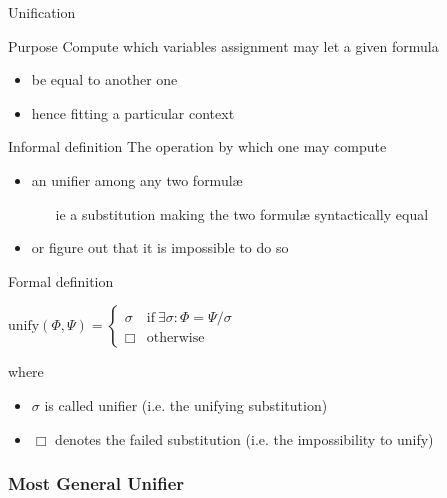 \documentclass[presentation]{beamer}\mode<presentation>{\usetheme{AMSBolognaFC}}
\begin{document}
\begin{frame}[allowframebreaks]{Unification}
    \begin{block}{Purpose}
        Compute which variables assignment may let a given formula
        \begin{itemize}
            \item be equal to another one
            \item hence fitting a particular context
        \end{itemize}
    \end{block}
    \begin{block}{Informal definition}
        The operation by which one may compute
        \begin{itemize}
            \item an \alert{unifier} among any two formul\ae{}
            \begin{itemize}
                \item[ie] a \alert{substitution} making the two formul\ae{} \alert{syntactically equal}
            \end{itemize}

            \item or figure out that it is impossible to do so
        \end{itemize}
    \end{block}
    \begin{alertblock}{Formal definition}
        \begin{center}
            $\text{unify}(\Phi, \Psi) = \begin{cases}
                \sigma & \text{if} ~ \exists \sigma : \Phi = \Psi / \sigma
                \\
                \Box & \text{otherwise}
            \end{cases}$
        \end{center}
        where
        \begin{itemize}
            \item \alert{$\sigma$} is called \alert{unifier} (i.e. the unifying substitution)
            \item \alert{$\Box$} denotes the \alert{failed} substitution (i.e. the impossibility to unify)
        \end{itemize}
    \end{alertblock}
\end{frame}

\subsubsection{Most General Unifier}
\end{document}
